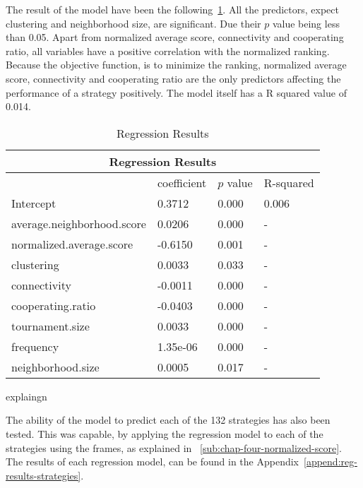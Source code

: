 The result of the model have been the following~\ref{regression-complex-networks}.
All the predictors, expect clustering and neighborhood size, are significant.
Due their \(p\) value being less than 0.05.
Apart from normalized average score, connectivity and cooperating ratio, all
variables have a positive correlation with the normalized ranking. Because the
objective function, is to minimize the ranking, normalized average score,
connectivity and cooperating ratio are the only predictors affecting the performance
of a strategy positively. The model itself has a R squared value of 0.014.

\begin{table}[!hbtp]
	\centering
	\begin{adjustbox}{width=0.5\textwidth}
		\small
		\begin{tabular}{|l|l|l|l|}
			\hline
			\multicolumn{4}{|c|}{Regression Results}         \\ \hline
			                           & coefficient & \(p\) value & R-squared \\ \hline
			Intercept                  & 0.3712      & 0.000       & 0.006     \\ \hline
			average.neighborhood.score & 0.0206      & 0.000       & -         \\ \hline
			normalized.average.score   & -0.6150     & 0.001       & -         \\ \hline
			clustering                 & 0.0033      & 0.033       & -         \\ \hline
			connectivity               & -0.0011     & 0.000       & -         \\ \hline
			cooperating.ratio          & -0.0403     & 0.000       & -         \\ \hline
			tournament.size            & 0.0033      & 0.000       & -         \\ \hline
			frequency                  & 1.35e-06    & 0.000       & -         \\ \hline
			neighborhood.size          & 0.0005      & 0.017       & -         \\ \hline

		\end{tabular}
	\end{adjustbox}
	\caption{Regression Results}
	\label{regression-complex-networks}
	explaingn
\end{table}

The ability of the model to predict each of the 132 strategies has also been
tested. This was capable, by applying the regression model to each of the strategies
using the frames, as explained in ~\ref{sub:chap-four-normalized-score}.
The results of each regression model, can be found in the Appendix~\ref{append:reg-results-strategies}.

